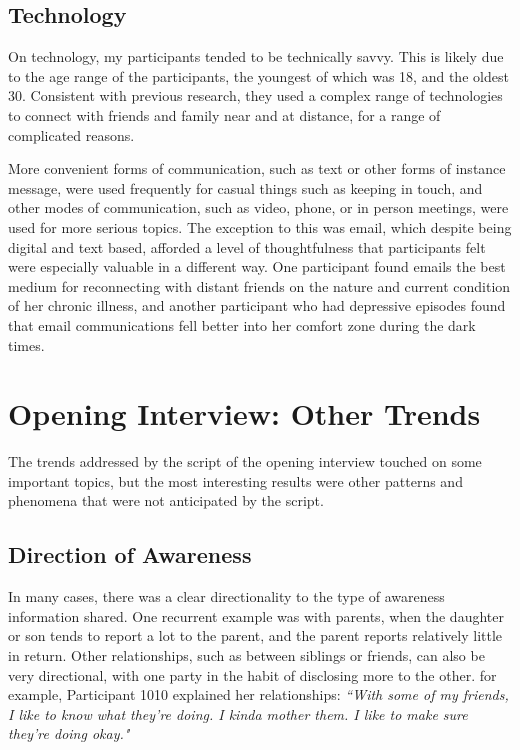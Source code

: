   \subsection{Technology}
  On technology,
  my participants tended to be technically savvy.
  This is likely due to the age range of the participants,
  the youngest of which was 18, and the oldest 30.
  Consistent with previous research,
  they used a complex range of technologies to connect
  with friends and family near and at distance,
  for a range of complicated reasons.

  More convenient forms of communication,
  such as text or other forms of instance message,
  were used frequently for casual things such as keeping in touch,
  and other modes of communication, such as video, phone, or in person meetings,
  were used for more serious topics.
  The exception to this was email,
  which despite being digital and text based, 
  afforded a level of thoughtfulness that participants
  felt were especially valuable in a different way.
  One participant found emails the best medium for reconnecting
  with distant friends on the nature and current condition of her
  chronic illness,
  and another participant who had depressive episodes found that
  email communications fell better into her comfort zone during the dark times.

\section{Opening Interview: Other Trends}
  The trends addressed by the script of the opening interview touched on
  some important topics, but the most interesting results
  were other patterns and phenomena
  that were not anticipated by the script.

  \subsection{Direction of Awareness}
  In many cases, there was a clear directionality to the type of awareness
  information shared.
  One recurrent example was with parents,
  when the daughter or son tends to report a lot to the parent,
  and the parent reports relatively little in return.
  Other relationships, such as between siblings or friends,
  can also be very directional,
  with one party in the habit of disclosing more to the other.
  for example, Participant 1010 explained her relationships:
  \textit{
  ``With some of my friends, I like to know what they're doing.
  I kinda mother them.
  I like to make sure they're doing okay."
  }

